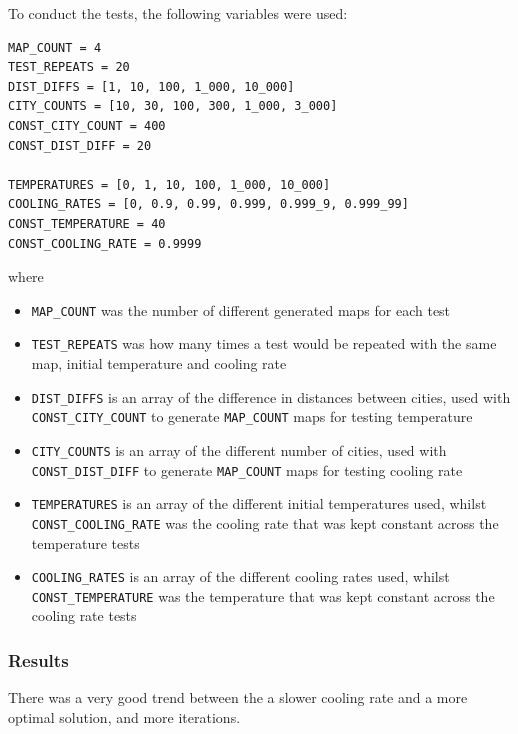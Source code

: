 \documentclass{article}
\begin{document}
To conduct the tests, the following variables were used:

\begin{verbatim}
MAP_COUNT = 4
TEST_REPEATS = 20
DIST_DIFFS = [1, 10, 100, 1_000, 10_000]
CITY_COUNTS = [10, 30, 100, 300, 1_000, 3_000]
CONST_CITY_COUNT = 400
CONST_DIST_DIFF = 20

TEMPERATURES = [0, 1, 10, 100, 1_000, 10_000]
COOLING_RATES = [0, 0.9, 0.99, 0.999, 0.999_9, 0.999_99]
CONST_TEMPERATURE = 40
CONST_COOLING_RATE = 0.9999
\end{verbatim}

where

\begin{itemize}
    \item \texttt{MAP\_COUNT} was the number of different generated maps for each test
    \item \texttt{TEST\_REPEATS} was how many times a test would be repeated with the same map, initial temperature and cooling rate
    \item \texttt{DIST\_DIFFS} is an array of the difference in distances between cities, used with \texttt{CONST\_CITY\_COUNT} to generate \texttt{MAP\_COUNT} maps for testing temperature
    \item \texttt{CITY\_COUNTS} is an array of the different number of cities, used with \texttt{CONST\_DIST\_DIFF} to generate \texttt{MAP\_COUNT} maps for testing cooling rate
    \item \texttt{TEMPERATURES} is an array of the different initial temperatures used, whilst \texttt{CONST\_COOLING\_RATE} was the cooling rate that was kept constant across the temperature tests
    \item \texttt{COOLING\_RATES} is an array of the different cooling rates used, whilst \texttt{CONST\_TEMPERATURE} was the temperature that was kept constant across the cooling rate tests
\end{itemize}

\newpage
\subsubsection{Results}

There was a very good trend between the a slower cooling rate and a more optimal solution, and more iterations.
\end{document}
